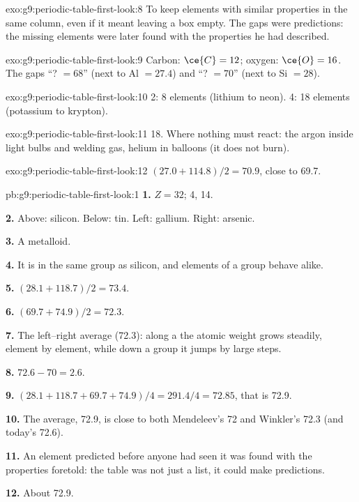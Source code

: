 \begin{solution}{exo:g9:periodic-table-first-look:8}
To keep elements with similar properties in the same column, even if it
meant leaving a box empty. The gaps were predictions: the missing
elements were later found with the properties he had described.
\end{solution}

\begin{solution}{exo:g9:periodic-table-first-look:9}
Carbon: $\ce{C} = 12$; oxygen: $\ce{O} = 16$. The gaps ``? $= 68$'' (next to
Al $= 27.4$) and ``? $= 70$'' (next to Si $= 28$).
\end{solution}

\begin{solution}{exo:g9:periodic-table-first-look:10}
 2: 8 elements (lithium to neon).  4: 18 elements (potassium
to krypton).
\end{solution}

\begin{solution}{exo:g9:periodic-table-first-look:11}
 18. Where nothing must react: the argon inside light bulbs and
welding gas, helium in balloons (it does not burn).
\end{solution}

\begin{solution}{exo:g9:periodic-table-first-look:12}
$(27.0 + 114.8)/2 = 70.9$, close to 69.7.
\end{solution}

\begin{solution}{pb:g9:periodic-table-first-look:1}
\textbf{1.} $Z = 32$;  4,  14.

\textbf{2.} Above: silicon. Below: tin. Left: gallium. Right: arsenic.

\textbf{3.} A metalloid.

\textbf{4.} It is in the same group as silicon, and elements of a group
behave alike.

\textbf{5.} $(28.1 + 118.7)/2 = 73.4$.

\textbf{6.} $(69.7 + 74.9)/2 = 72.3$.

\textbf{7.} The left--right average (72.3): along a  the atomic
weight grows steadily, element by element, while down a group it jumps
by large steps.

\textbf{8.} $72.6 - 70 = 2.6$.

\textbf{9.} $(28.1 + 118.7 + 69.7 + 74.9)/4 = 291.4/4 = 72.85$, that is
72.9.

\textbf{10.} The average, 72.9, is close to both Mendeleev's 72 and
Winkler's 72.3 (and today's 72.6).

\textbf{11.} An element predicted before anyone had seen it was found with
the properties foretold: the table was not just a list, it could make
predictions.

\textbf{12.} About 72.9.
\end{solution}
